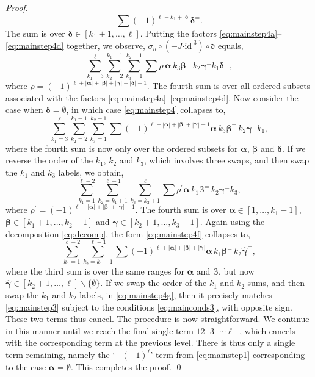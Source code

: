 \documentclass[5p,twocolumn]{elsarticle}
\newcommand*{\id}{{\mathrm{id}}}
\newcommand*{\df}{\mathfrak d}
\newcommand*{\cendot}{\boldsymbol{\cdot}}
\newcommand*{\balpha}{\boldsymbol{\alpha}}
\newcommand*{\bbeta}{\boldsymbol{\beta}}
\newcommand*{\bgamma}{\boldsymbol{\gamma}}
\newcommand*{\bdelta}{\boldsymbol{\delta}}
\begin{document}
\begin{proof}
\begin{equation}
    \sum(-1)^{\ell-k_1+|\bdelta|}\bdelta^=.
\end{equation}
The sum is over $\bdelta\in[k_1+1,\ldots,\ell]$.
Putting the factors \eqref{eq:mainstep4a}--\eqref{eq:mainstep4d} together, we observe, $\sigma_n\circ(-J\cendot\id^{\cendot3})\circ\df$ equals,
\begin{equation}\label{eq:mainstep4}
   \sum_{k_1=3}^\ell\sum_{k_2=2}^{k_1-1}\sum_{k_3=1}^{k_2-1} \sum\rho\,\balpha\,k_3\bbeta^=\,k_2\bgamma^=k_1\bdelta^=,
\end{equation}
where $\rho=(-1)^{\ell+|\balpha|+|\bbeta|+|\bgamma|+|\bdelta|-1}$.
The fourth sum is over all ordered subsets associated with the factors \eqref{eq:mainstep4a}--\eqref{eq:mainstep4d}.
Now consider the case when $\bdelta=\emptyset$, in which case \eqref{eq:mainstep4} collapses to, 
\begin{equation}\label{eq:mainstep4e}
   \sum_{k_1=3}^\ell\sum_{k_2=2}^{k_1-1}\sum_{k_3=1}^{k_2-1} \sum(-1)^{\ell+|\balpha|+|\bbeta|+|\bgamma|-1}\balpha\,k_3\bbeta^=\,k_2\bgamma^=k_1,
\end{equation}
where the fourth sum is now only over the ordered subsets for $\balpha$, $\bbeta$ and $\bdelta$.
If we reverse the order of the $k_1$, $k_2$ and $k_3$, which involves three swaps, and then swap the $k_1$ and $k_3$ labels, we obtain,
\begin{equation}\label{eq:mainstep4f}
   \sum_{k_1=1}^{\ell-2}\sum_{k_2=k_1+1}^{\ell-1}\sum_{k_3=k_2+1}^{\ell} \sum\rho^\prime\balpha\,k_1\bbeta^=\,k_2\bgamma^=k_3,
\end{equation}
where $\rho^\prime=(-1)^{\ell+|\balpha|+|\bbeta|+|\bgamma|-1}$.
The fourth sum is over $\balpha\in[1,\ldots,k_1-1]$, $\bbeta\in[k_1+1,\ldots,k_2-1]$ and $\bgamma\in[k_2+1,\ldots,k_3-1]$.
Again using the decomposition \eqref{eq:decomp}, the form \eqref{eq:mainstep4f} collapses to,
\begin{equation}\label{eq:mainstep4g}
   \sum_{k_1=1}^{\ell-2}\sum_{k_2=k_1+1}^{\ell-1}\sum(-1)^{\ell+|\balpha|+|\bbeta|+|\bgamma|}\balpha\,k_1\bbeta^=\,k_2\hat{\bgamma}^=,
\end{equation}
where the third sum is over the same ranges for $\balpha$ and $\bbeta$, but now $\hat{\bgamma}\in[k_2+1,\ldots,\ell]\backslash\{\emptyset\}$.
If we swap the order of the $k_1$ and $k_2$ sums, and then swap the $k_1$ and $k_2$ labels, in \eqref{eq:mainstep4g},
then it precisely matches \eqref{eq:mainstep3} subject to the conditions \eqref{eq:mainconds3}, with opposite sign.
These two terms thus cancel.
The procedure is now straightforward. We continue in this manner until we reach the final single term $12^=3^=\cdots\ell^=$, which cancels with the corresponding term at the previous level.
There is thus only a single term remaining, namely the `$-(-1)^{\ell}$' term from \eqref{eq:mainstep1} corresponding to the case $\balpha=\emptyset$.
This completes the proof.
\qed
\end{proof}
\end{document}
